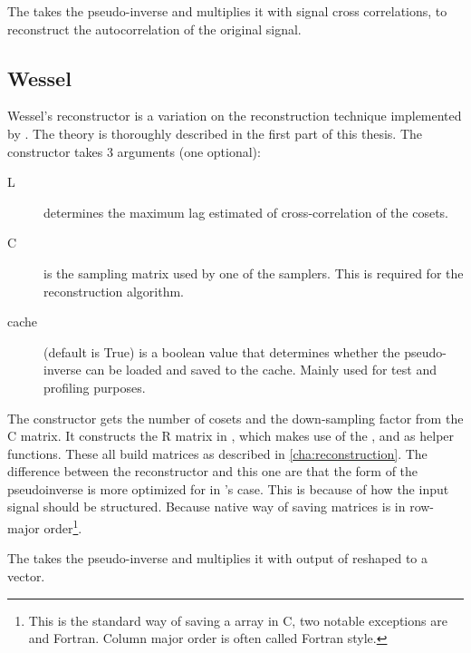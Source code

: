 \documentclass[a4paper, openany, oneside]{memoir}
\begin{document}
The  takes the pseudo-inverse and multiplies it with signal cross correlations, to reconstruct the autocorrelation of the original signal.

\subsection{Wessel}
\label{sub:wessel}
Wessel's reconstructor is a variation on the reconstruction technique implemented by . The theory is thoroughly described in the first part of this thesis. The constructor takes 3 arguments (one optional):
\begin{description}
    \item[L] determines the maximum lag estimated of cross-correlation of the cosets.
    \item[C] is the sampling matrix used by one of the samplers. This is required for the reconstruction algorithm.
    \item[cache] (default is True) is a boolean value that determines whether the pseudo-inverse can be loaded and saved to the cache. Mainly used for test and profiling purposes.
\end{description}
The constructor gets the number of cosets and the down-sampling factor from the C matrix. It constructs the R matrix in , which makes use of the ,  and  as helper functions. These all build matrices as described in \cref{cha:reconstruction}. The difference between the  reconstructor and this one are that the form of the pseudoinverse is more optimized for  in 's case. This is because of how the input signal should be structured. Because  native way of saving matrices is in row-major order\footnote{This is the standard way of saving a array in C, two notable exceptions are \matlab and Fortran. Column major order is often called Fortran style.}.

The  takes the pseudo-inverse and multiplies it with output of  reshaped to a vector.
\end{document}
